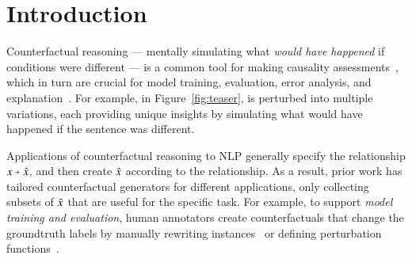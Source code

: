 \section{Introduction}
\label{sec:intro}



Counterfactual reasoning --- mentally simulating what \emph{would have happened} if conditions were different --- is a common tool for making causality assessments~\cite{kahneman}, which in turn are crucial for model training, evaluation, error analysis, and explanation~\cite{miller}. 
For example, in Figure~\ref{fig:teaser},  is perturbed into multiple variations, each providing unique insights by simulating what would have happened if the sentence was different.

Applications of counterfactual reasoning to NLP generally specify the relationship $x \veryshortarrow \xp$, and then create $\hat{x}$ according to the relationship.
As a result, prior work has tailored counterfactual generators for different applications, only collecting subsets of $\hat{x}$ that are useful for the specific task.
For example, to support {\em model training and evaluation}, human annotators create counterfactuals that change the groundtruth labels by manually rewriting instances~\cite{gardner2020contrast, qin-etal-2019-counterfactual} or defining perturbation functions~\cite{checklist:acl20}.
